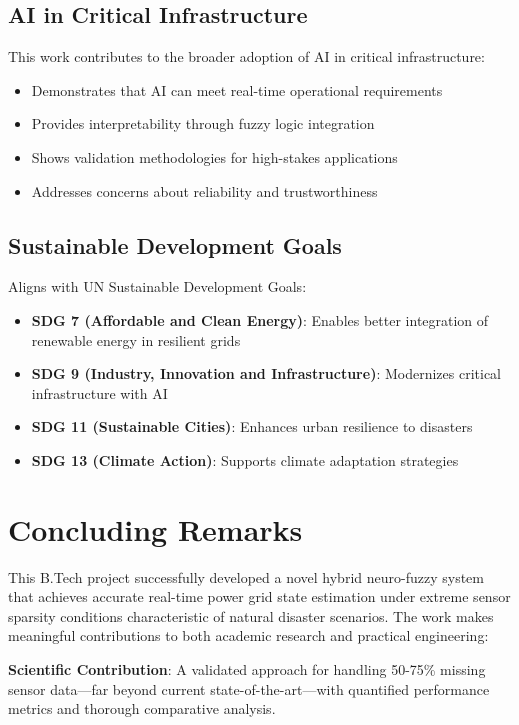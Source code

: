 \documentclass[12pt,a4paper]{report}
\begin{document}
\subsection{AI in Critical Infrastructure}

This work contributes to the broader adoption of AI in critical infrastructure:
\begin{itemize}
    \item Demonstrates that AI can meet real-time operational requirements
    \item Provides interpretability through fuzzy logic integration
    \item Shows validation methodologies for high-stakes applications
    \item Addresses concerns about reliability and trustworthiness
\end{itemize}

\subsection{Sustainable Development Goals}

Aligns with UN Sustainable Development Goals:
\begin{itemize}
    \item \textbf{SDG 7 (Affordable and Clean Energy)}: Enables better integration of renewable energy in resilient grids
    \item \textbf{SDG 9 (Industry, Innovation and Infrastructure)}: Modernizes critical infrastructure with AI
    \item \textbf{SDG 11 (Sustainable Cities)}: Enhances urban resilience to disasters
    \item \textbf{SDG 13 (Climate Action)}: Supports climate adaptation strategies
\end{itemize}

\section{Concluding Remarks}

This B.Tech project successfully developed a novel hybrid neuro-fuzzy system that achieves accurate real-time power grid state estimation under extreme sensor sparsity conditions characteristic of natural disaster scenarios. The work makes meaningful contributions to both academic research and practical engineering:

\textbf{Scientific Contribution}: A validated approach for handling 50-75\% missing sensor data—far beyond current state-of-the-art—with quantified performance metrics and thorough comparative analysis.
\end{document}
